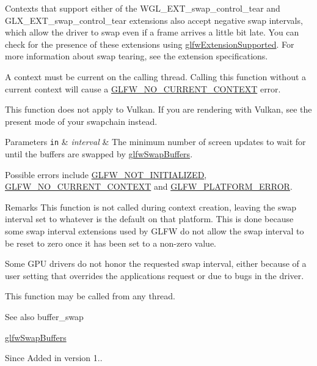 Contexts that support either of the {\ttfamily W\+G\+L\+\_\+\+E\+X\+T\+\_\+swap\+\_\+control\+\_\+tear} and {\ttfamily G\+L\+X\+\_\+\+E\+X\+T\+\_\+swap\+\_\+control\+\_\+tear} extensions also accept negative swap intervals, which allow the driver to swap even if a frame arrives a little bit late. You can check for the presence of these extensions using \hyperlink{group__context_ga9a28c712d35f9e43534e1d03b051c04c}{glfw\+Extension\+Supported}. For more information about swap tearing, see the extension specifications.

A context must be current on the calling thread. Calling this function without a current context will cause a \hyperlink{group__errors_gaa8290386e9528ccb9e42a3a4e16fc0d0}{G\+L\+F\+W\+\_\+\+N\+O\+\_\+\+C\+U\+R\+R\+E\+N\+T\+\_\+\+C\+O\+N\+T\+E\+XT} error.

This function does not apply to Vulkan. If you are rendering with Vulkan, see the present mode of your swapchain instead.


\begin{DoxyParams}[1]{Parameters}
\mbox{\tt in}  & {\em interval} & The minimum number of screen updates to wait for until the buffers are swapped by \hyperlink{group__window_gafb827800eedbfcbc97b1e5408df668d7}{glfw\+Swap\+Buffers}.\\
\hline
\end{DoxyParams}
Possible errors include \hyperlink{group__errors_ga2374ee02c177f12e1fa76ff3ed15e14a}{G\+L\+F\+W\+\_\+\+N\+O\+T\+\_\+\+I\+N\+I\+T\+I\+A\+L\+I\+Z\+ED}, \hyperlink{group__errors_gaa8290386e9528ccb9e42a3a4e16fc0d0}{G\+L\+F\+W\+\_\+\+N\+O\+\_\+\+C\+U\+R\+R\+E\+N\+T\+\_\+\+C\+O\+N\+T\+E\+XT} and \hyperlink{group__errors_gad44162d78100ea5e87cdd38426b8c7a1}{G\+L\+F\+W\+\_\+\+P\+L\+A\+T\+F\+O\+R\+M\+\_\+\+E\+R\+R\+OR}.

\begin{DoxyRemark}{Remarks}
This function is not called during context creation, leaving the swap interval set to whatever is the default on that platform. This is done because some swap interval extensions used by G\+L\+FW do not allow the swap interval to be reset to zero once it has been set to a non-\/zero value.

Some G\+PU drivers do not honor the requested swap interval, either because of a user setting that overrides the application\textquotesingle{}s request or due to bugs in the driver.
\end{DoxyRemark}
This function may be called from any thread.

\begin{DoxySeeAlso}{See also}
buffer\+\_\+swap 

\hyperlink{group__window_gafb827800eedbfcbc97b1e5408df668d7}{glfw\+Swap\+Buffers}
\end{DoxySeeAlso}
\begin{DoxySince}{Since}
Added in version 1.. 
\end{DoxySince}
